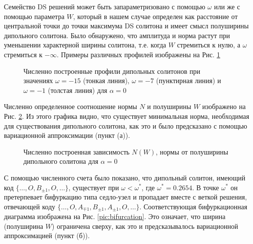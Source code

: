 Семейство DS решений может быть запараметризовано с помощью $\omega$ или же с помощью параметра $W$, который в нашем случае определен как расстояние от центральной точки до точки максимума DS солитона и имеет смысл полуширины дипольного солитона.
Было обнаружено, что амплитуда и норма растут при уменьшении характерной ширины солитона, т.е. когда $W$ стремиться к нулю, а $\omega$ стремиться к $-\infty$.
Примеры различных профилей изображены на Рис. \ref{pic:dss}
%
\begin{figure}
\caption{Численно построенные профили дипольных солитонов при значениях $\omega = -15$ (тонкая линия), $\omega = -7$ (пунктирная линия) и $\omega = -1$ (толстая линия) для $\alpha = 0$}
\label{pic:dss}
\end{figure}
%

Численно определенное соотношение нормы $N$ и полуширины $W$ изображено на Рис. \ref{pic:N(W)_numerical}.
Из этого графика видно, что существует минимальная норма, необходимая для существования дипольного солитона, как это и было предсказано с помощью вариационной аппроксимации (пункт (а)).
%
\begin{figure}
\caption{Численно построенная зависимость $N(W)$, нормы от полуширины дипольного солитона для $\alpha = 0$}
\label{pic:N(W)_numerical}
\end{figure}
%

С помощью численного счета было показано, что дипольный солитон, имеющий код $\{ \dots, O, B_{\pm 1}, O, \dots \}$, существует при $\omega < \omega^*$, где $\omega^* = 0.2654$.
В точке $\omega^*$ он претерпевает бифуркацию типа седло-узел и пропадает вместе с веткой решения, отвечающей коду $\{ \dots, O, A_{\mp 1}, B_{\pm 1}, A_{\pm 1}, O, \dots \}$.
Соответствующая бифуркационная диаграмма изображена на Рис. \ref{pic:bifurcation}.
Это означает, что ширина (полуширина $W$) ограничена сверху, как это и предсказывалось вариационной аппроксимацией (пункт (б)).

